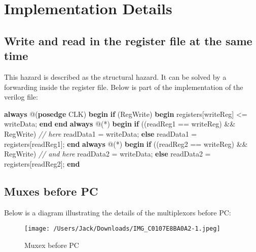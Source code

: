 \documentclass[
]{article}
\newenvironment{Shaded}{}{}
\newcommand{\CommentTok}[1]{\textcolor[rgb]{0.38,0.63,0.69}{\textit{#1}}}
\newcommand{\KeywordTok}[1]{\textcolor[rgb]{0.00,0.44,0.13}{\textbf{#1}}}
\newcommand{\NormalTok}[1]{#1}
\begin{document}
\hypertarget{header-n6}{%
\section{Implementation Details}\label{header-n6}}

\hypertarget{header-n12}{%
\subsection{Write and read in the register file at the same
time}\label{header-n12}}

This hazard is described as the structural hazard. It can be solved by a
forwarding inside the register file. Below is part of the implementation
of the verilog file:

\begin{Shaded}
\begin{Highlighting}[]
\KeywordTok{always}\NormalTok{ @(}\KeywordTok{posedge}\NormalTok{ CLK) }\KeywordTok{begin}
        \KeywordTok{if}\NormalTok{ (RegWrite) }\KeywordTok{begin}
\NormalTok{            registers[writeReg] \textless{}= writeData;}
        \KeywordTok{end}
    \KeywordTok{end}
    \KeywordTok{always}\NormalTok{ @(*) }\KeywordTok{begin}
        \KeywordTok{if}\NormalTok{ ((readReg1 == writeReg) \&\& RegWrite) }\CommentTok{// here}
\NormalTok{            readData1 = writeData;}
        \KeywordTok{else} 
\NormalTok{            readData1 = registers[readReg1];}
    \KeywordTok{end}
    \KeywordTok{always}\NormalTok{ @(*) }\KeywordTok{begin}
        \KeywordTok{if}\NormalTok{ ((readReg2 == writeReg) \&\& RegWrite) }\CommentTok{// and here}
\NormalTok{            readData2 = writeData;}
        \KeywordTok{else} 
\NormalTok{            readData2 = registers[readReg2];}
    \KeywordTok{end}
\end{Highlighting}
\end{Shaded}

\hypertarget{header-n59}{%
\subsection{Muxes before PC}\label{header-n59}}

Below is a diagram illustrating the details of the multiplexors before
PC:

\begin{figure}
\centering
\texttt{[image: /Users/Jack/Downloads/IMG\_C0107E8BA0A2-1.jpeg]}
\caption{Muxex before PC}
\end{figure}
\end{document}
